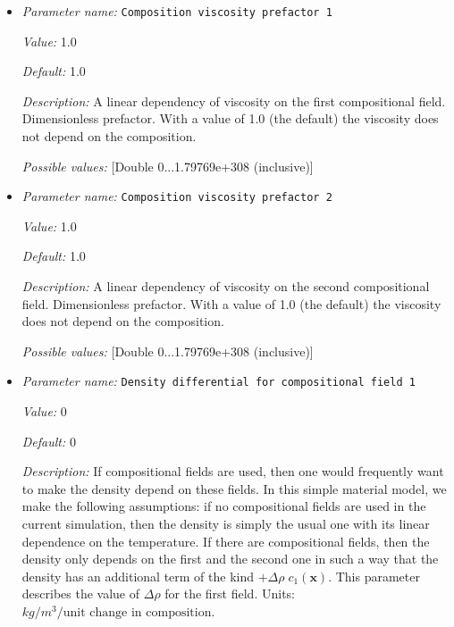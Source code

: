\begin{itemize}
\item {\it Parameter name:} {\tt Composition viscosity prefactor 1}
\label{parameters:Material model/Composition reaction model/Composition viscosity prefactor 1}


{\it Value:} 1.0


{\it Default:} 1.0


{\it Description:} A linear dependency of viscosity on the first compositional field. Dimensionless prefactor. With a value of 1.0 (the default) the viscosity does not depend on the composition.


{\it Possible values:} [Double 0...1.79769e+308 (inclusive)]
\item {\it Parameter name:} {\tt Composition viscosity prefactor 2}
\label{parameters:Material model/Composition reaction model/Composition viscosity prefactor 2}


{\it Value:} 1.0


{\it Default:} 1.0


{\it Description:} A linear dependency of viscosity on the second compositional field. Dimensionless prefactor. With a value of 1.0 (the default) the viscosity does not depend on the composition.


{\it Possible values:} [Double 0...1.79769e+308 (inclusive)]
\item {\it Parameter name:} {\tt Density differential for compositional field 1}
\label{parameters:Material model/Composition reaction model/Density differential for compositional field 1}


{\it Value:} 0


{\it Default:} 0


{\it Description:} If compositional fields are used, then one would frequently want to make the density depend on these fields. In this simple material model, we make the following assumptions: if no compositional fields are used in the current simulation, then the density is simply the usual one with its linear dependence on the temperature. If there are compositional fields, then the density only depends on the first and the second one in such a way that the density has an additional term of the kind $+\Delta \rho \; c_1(\mathbf x)$. This parameter describes the value of $\Delta \rho$ for the first field. Units: $kg/m^3/\textrm{unit change in composition}$.



\end{itemize}
